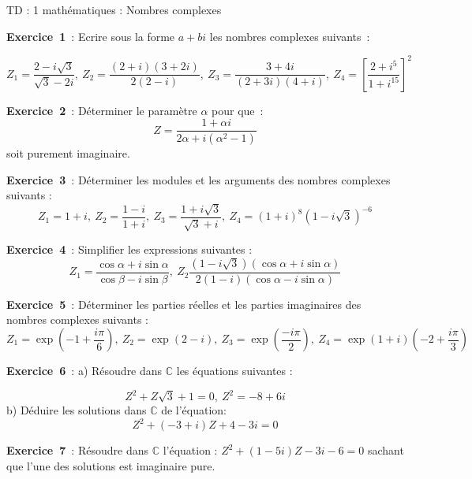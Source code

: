 \documentclass[12pt, a4paper]{article}
\begin{document}
\begin{center}
\large\sc 

TD : 1 mathématiques : Nombres complexes
\end{center}

{\bf Exercice~1}~: Ecrire sous la forme $a+bi$ les nombres complexes suivants~:

\begin{equation*}
Z_{1}=\frac{2-i\sqrt{3}}{\sqrt{3}-2i},~Z_{2}=\frac{(2+i)(3+2i)}{2(2-i)},~Z_{3} = \frac{3+4i}{(2+3i)(4+i)},~Z_{4}=[\frac{2+i^5}{1+i^{15}}]^2
\end{equation*}

{\bf Exercice~2}~: Déterminer le paramètre $\alpha$ pour que~:
\begin{equation*}
Z=\frac{1+\alpha i}{2\alpha + i(\alpha^2-1)}
\end{equation*}
soit purement imaginaire.

{\bf Exercice~3}~: Déterminer les modules et les arguments des nombres complexes suivants :
\begin{equation*}
Z_{1}=1+i,~Z_{2}=\frac{1-i}{1+i},~Z_{3}=\frac{1+i\sqrt{3}}{\sqrt{3}+i},~Z_{4}=(1+i)^8(1-i\sqrt{3})^{-6}
\end{equation*}

{\bf Exercice~4}~: Simplifier les expressions suivantes :
\begin{equation*}
Z_{1}=\frac{\cos\alpha+i\sin\alpha}{\cos\beta-i\sin\beta},~Z_{2}\frac{(1-i\sqrt{3})(\cos\alpha+i\sin\alpha)}{2(1-i)(\cos\alpha-i\sin\alpha)}
\end{equation*}

{\bf Exercice~5}~: Déterminer les parties réelles et les parties imaginaires des nombres complexes suivants :
\begin{equation*}
Z_{1} = \exp(-1+\frac{i\pi}{6}),~Z_{2}=\exp(2-i),~Z_{3}=\exp(\frac{-i\pi}{2}),~Z_{4}=\exp(1+i)(-2+\frac{i\pi}{3})
\end{equation*}

{\bf Exercice~6}~: 
a) Résoudre dans $\mathbb{C}$ les équations suivantes :

\begin{equation*}
Z^2+Z\sqrt{3}+1=0,~Z^2=-8+6i
\end{equation*}
b) Déduire les solutions dans $\mathbb{C}$ de l'équation:
\begin{equation*}
Z^2+(-3+i)Z+4-3i=0
\end{equation*}

{\bf Exercice~7}~: Résoudre dans $\mathbb{C}$ l'équation : 
$Z^2+(1-5i)Z-3i-6=0$ sachant que l'une des solutions est imaginaire pure.
\end{document}
